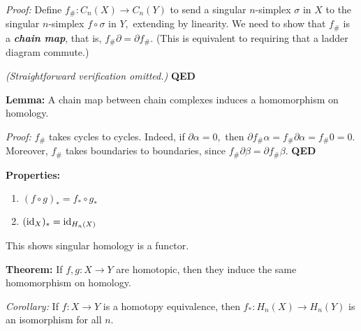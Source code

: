 \documentclass{article}
\begin{document}
\emph{Proof:} Define $f_\#: C_n(X) \to C_n(Y)$ to send a singular $n$-simplex $\sigma$ in $X$ to the singular $n$-simplex $f \circ \sigma$ in $Y,$ extending by linearity. We need to show that $f_\#$ is a \textbf{\emph{chain map}}, that is, $f_\# \partial = \partial f_\#.$ (This is equivalent to requiring that a ladder diagram commute.)%

\emph{(Straightforward verification omitted.)} \textbf{QED}%

\textbf{Lemma:} A chain map between chain complexes induces a homomorphism on homology.%

\emph{Proof:} $f_\#$ takes cycles to cycles. Indeed, if $\partial\alpha = 0,$ then $\partial f_\# \alpha = f_\# \partial \alpha = f_\# 0 = 0.$ Moreover, $f_\#$ takes boundaries to boundaries, since $f_\#\partial\beta = \partial f_\# \beta.$ \textbf{QED}%

\textbf{Properties:}%

\begin{enumerate}[noitemsep,topsep=\mdcompacttopsep]%

\item{}$(f \circ g)_* = f_* \circ g_*$%

\item{}$(\operatorname{id}_X)_* = \operatorname{id}_{H_n(X)}$%
\end{enumerate}%

\noindent{}This shows singular homology is a functor.%

\textbf{Theorem:} If $f,g: X \to Y$ are homotopic, then they induce the same homomorphism on homology.%

\emph{Corollary:} If $f: X \to Y$ is a homotopy equivalence, then $f_*: H_n(X) \to H_n(Y)$ is an isomorphism for all $n.$%
\end{document}
